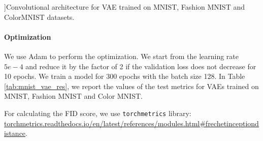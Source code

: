 \begin{table}[ht]
\caption[][\baselineskip]{Convolutional architecture for VAE trained on MNIST, Fashion MNIST and ColorMNIST datasets.}
\label{tab:mnist_arch}
\begin{center}
\end{center}
          \vspace*{\baselineskip}
\end{table}

\paragraph{Optimization} We use Adam to perform the optimization. We start from the learning rate $5e-4$ and reduce it by the factor of 2 if the validation loss does not decrease for 10 epochs. We train a model for 300 epochs with the batch size 128. In Table \ref{tab:mnist_vae_res}, we report the values of the test metrics for VAEs trained on MNIST, Fashion MNIST and Color MNIST. 

For calculating the FID score, we use \texttt{torchmetrics} library: \url{torchmetrics.readthedocs.io/en/latest/references/modules.html#frechetinceptiondistance}.


